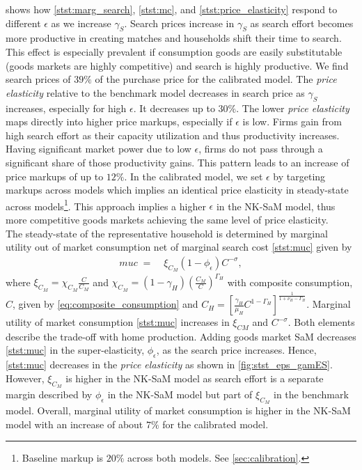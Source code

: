 \documentclass[12pt,3p,authoryear,review]{elsarticle}
\begin{document}
 shows how \eqref{stst:marg_search}, \eqref{stst:mc}, and \eqref{stst:price_elasticity} respond to different $\epsilon$ as we increase $\gamma_S$. Search prices increase in $\gamma_S$ as search effort becomes more productive in creating matches and households shift their time to search. This effect is especially prevalent if consumption goods are easily substitutable (goods markets are highly competitive) and search is highly productive. We find search prices of $39\%$ of the purchase price for the calibrated model. The \emph{price elasticity} relative to the benchmark model decreases in search price as $\gamma_S$ increases, especially for high $\epsilon$. It decreases up to $30\%$. The lower \emph{price elasticity} maps directly into higher price markups, especially if $\epsilon$ is low. Firms gain from high search effort as their capacity utilization and thus productivity increases. Having significant market power due to low $\epsilon$, firms do not pass through a significant share of those productivity gains. This pattern leads to an increase of price markups of up to $12\%$. In the calibrated model, we set $\epsilon$ by targeting markups across models which implies an identical price elasticity in steady-state across models\footnote{Baseline markup is $20\%$ across both models. See \cref{sec:calibration}.}. This approach implies a higher $\epsilon$ in the NK-SaM model, thus more competitive goods markets achieving the same level of price elasticity.\\%
The steady-state of the representative household is determined by marginal utility out of market consumption net of marginal search cost \eqref{stst:muc} given by %
\begin{align}%
	muc \; = & \; \xi_{C_M} \left( 1 - \phi_\epsilon \right) C^{-\sigma},\label{stst:muc}%
\end{align}%
where $\xi_{C_M} = \chi_{C_M}\frac{C}{C_M}$ and $\chi_{C_M}=\left(1-\gamma_H\right)\left(\frac{C_M}{C}\right)^{\Gamma_H}$ with composite consumption, $C$, given by \eqref{eq:composite_consumption} and $C_H = \left[ \frac{\gamma_H}{\mu_H} C^{1-\Gamma_H}\right]^{\frac{1}{1+\nu_H-\Gamma_H}}$. Marginal utility of market consumption \eqref{stst:muc} increases in $\xi_{CM}$ and $C^{-\sigma}$. Both elements describe the trade-off with home production. Adding goods market SaM decreases \eqref{stst:muc} in the super-elasticity, $\phi_\epsilon$, as the search price increases. Hence, \eqref{stst:muc} decreases in the \emph{price elasticity} as shown in \cref{fig:stst_eps_gamES}. However, $\xi_{C_M}$ is higher in the NK-SaM model as search effort is a separate margin described by $\phi_\epsilon$ in the NK-SaM model but part of $\xi_{C_M}$ in the benchmark model. Overall, marginal utility of market consumption is higher in the NK-SaM model with an increase of about $7\%$ for the calibrated model.\\%
\end{document}
